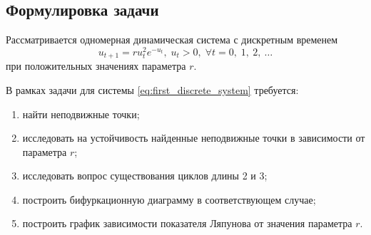 \subsection{Формулировка задачи}

Рассматривается одномерная динамическая система с дискретным временем
\begin{equation} \label{eq:first_discrete_system}
    u_{t+1} = r u_t^2 e^{-u_t},\; u_t > 0,\; \forall t = 0,\; 1,\: 2,\: \ldots
\end{equation}
при положительных значениях параметра $r$.

В рамках задачи для системы \ref{eq:first_discrete_system} требуется:
\begin{enumerate}
    \item найти неподвижные точки;
    \item исследовать на устойчивость найденные неподвижные точки в зависимости от параметра $r$;
    \item исследовать вопрос существования циклов длины 2 и 3;
    \item построить бифуркационную диаграмму в соответствующем случае;
    \item построить график зависимости показателя Ляпунова от значения параметра $r$.
\end{enumerate}